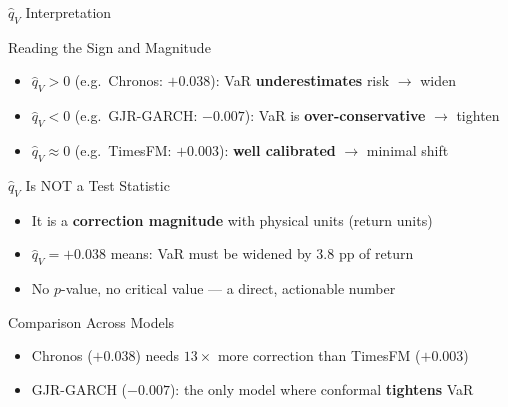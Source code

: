 \documentclass[9pt, aspectratio=169, t]{beamer}
\newcommand{\qV}{\hat{q}_V}
\begin{document}
\begin{frame}{$\qV$ Interpretation}
	\vspace{-0.3cm}
	{\footnotesize
	\begin{exampleblock}{Reading the Sign and Magnitude}
		\begin{itemize}\setlength{\itemsep}{1pt}
			\item $\qV > 0$ (e.g.\ Chronos: $+0.038$): VaR \textbf{underestimates} risk $\to$ widen
			\item $\qV < 0$ (e.g.\ GJR-GARCH: $-0.007$): VaR is \textbf{over-conservative} $\to$ tighten
			\item $\qV \approx 0$ (e.g.\ TimesFM: $+0.003$): \textbf{well calibrated} $\to$ minimal shift
		\end{itemize}
	\end{exampleblock}
	\begin{block}{$\qV$ Is NOT a Test Statistic}
		\begin{itemize}\setlength{\itemsep}{1pt}
			\item It is a \textbf{correction magnitude} with physical units (return units)
			\item $\qV = +0.038$ means: VaR must be widened by 3.8 pp of return
			\item No $p$-value, no critical value --- a direct, actionable number
		\end{itemize}
	\end{block}
	\begin{exampleblock}{Comparison Across Models}
		\begin{itemize}\setlength{\itemsep}{1pt}
			\item Chronos ($+0.038$) needs $13\times$ more correction than TimesFM ($+0.003$)
			\item GJR-GARCH ($-0.007$): the only model where conformal \textbf{tightens} VaR
		\end{itemize}
	\end{exampleblock}
	}
\end{frame}
\end{document}
